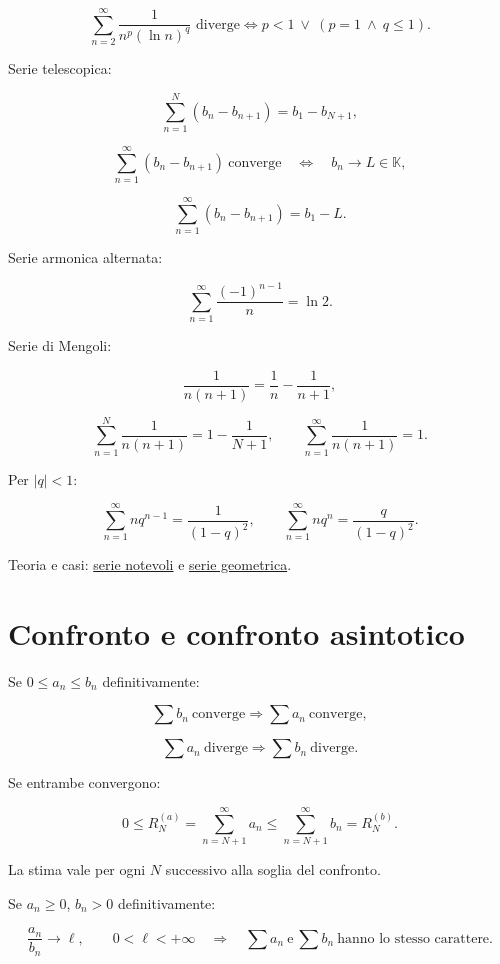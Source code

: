 \[
\displaystyle
\sum_{n=2}^{\infty}\frac1{n^p(\ln n)^q}\text{ diverge}
\Longleftrightarrow
p<1\ \lor\ (p=1\ \land\ q\le1).
\]

Serie telescopica:

\[
\displaystyle
\sum_{n=1}^{N}(b_n-b_{n+1})
=
b_1-b_{N+1},
\]

\[
\displaystyle
\sum_{n=1}^{\infty}(b_n-b_{n+1})
\ \text{converge}
\quad\Longleftrightarrow\quad
b_n\to L\in\mathbb K,
\]

\[
\displaystyle
\sum_{n=1}^{\infty}(b_n-b_{n+1})
=
b_1-L.
\]

Serie armonica alternata:

\[
\displaystyle
\sum_{n=1}^{\infty}\frac{(-1)^{n-1}}n=\ln2.
\]

Serie di Mengoli:

\[
\frac1{n(n+1)}=\frac1n-\frac1{n+1},
\]

\[
\sum_{n=1}^{N}\frac1{n(n+1)}=1-\frac1{N+1},
\qquad
\sum_{n=1}^{\infty}\frac1{n(n+1)}=1.
\]

Per \(|q|<1\):

\[
\sum_{n=1}^{\infty}nq^{n-1}=\frac1{(1-q)^2},
\qquad
\sum_{n=1}^{\infty}nq^n=\frac{q}{(1-q)^2}.
\]

Teoria e casi: \href{https://ingegnerismo.it/matematica/serie-notevoli/}{serie notevoli} e \href{https://ingegnerismo.it/matematica/serie-geometrica/}{serie geometrica}.

\section{Confronto e confronto asintotico}\label{confronto-e-confronto-asintotico}

Se \(0\le a_n\le b_n\) definitivamente:

\[
\displaystyle
\sum b_n\ \text{converge}
\Longrightarrow
\sum a_n\ \text{converge},
\]

\[
\displaystyle
\sum a_n\ \text{diverge}
\Longrightarrow
\sum b_n\ \text{diverge}.
\]

Se entrambe convergono:

\[
\displaystyle
0\le
R_N^{(a)}
=
\sum_{n=N+1}^{\infty}a_n
\le
\sum_{n=N+1}^{\infty}b_n
=
R_N^{(b)}.
\]

La stima vale per ogni \(N\) successivo alla soglia del confronto.

Se \(a_n\ge0\), \(b_n>0\) definitivamente:

\[
\displaystyle
\frac{a_n}{b_n}\to\ell,
\qquad
0<\ell<+\infty
\quad\Longrightarrow\quad
\sum a_n\ \text{e}\ \sum b_n\ \text{hanno lo stesso carattere}.
\]

